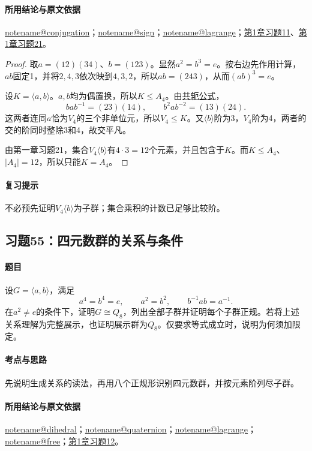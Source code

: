 \documentclass[UTF8,a4paper,11pt,fontset=windows]{ctexart}
\makeatletter
\newcommand{\noteref}[1]{\hyperref[note:#1]{\csname notename@#1\endcsname}}
\newcommand{\proofref}[2]{\hyperref[note:#1]{#2}}
\newcommand{\exref}[2]{\hyperref[ex:#1:#2]{第#1章习题#2}}
\makeatother
\begin{document}
\paragraph{所用结论与原文依据}
\noteref{conjugation}；\noteref{sign}；\noteref{lagrange}；\exref{1}{11}、\exref{1}{21}。


\begin{proof}
取$a=(12)(34)$、$b=(123)$。显然$a^2=b^3=e$。按右边先作用计算，$ab$固定1，并将$2,4,3$依次映到$4,3,2$，所以$ab=(243)$，从而$(ab)^3=e$。

设$K=\langle a,b\rangle$。$a,b$均为偶置换，所以$K\leq A_4$。由\proofref{conjugation}{共轭公式}，
\[
bab^{-1}=(23)(14),\qquad b^2ab^{-2}=(13)(24).
\]
这两者连同$a$恰为$V_4$的三个非单位元，所以$V_4\leq K$。又$\langle b\rangle$阶为3，$V_4$阶为4，两者的交的阶同时整除3和4，故交平凡。

由第一章习题21，集合$V_4\langle b\rangle$有$4\cdot3=12$个元素，并且包含于$K$。而$K\leq A_4$、$|A_4|=12$，所以只能$K=A_4$。
\end{proof}

\paragraph{复习提示}
不必预先证明$V_4\langle b\rangle$为子群；集合乘积的计数已足够比较阶。


\subsection{习题55：\texorpdfstring{四元数群的关系与条件}{四元数群的关系与条件}}
\label{ex:2:55}

\paragraph{题目}
设$G=\langle a,b\rangle$，满足
\[
a^4=b^4=e,\qquad a^2=b^2,\qquad b^{-1}ab=a^{-1}.
\]
在$a^2\ne e$的条件下，证明$G\cong Q_8$，列出全部子群并证明每个子群正规。若将上述关系理解为完整展示，也证明展示群为$Q_8$。仅要求等式成立时，说明为何须加限定。

\paragraph{考点与思路}
先说明生成关系的读法，再用八个正规形识别四元数群，并按元素阶列尽子群。

\paragraph{所用结论与原文依据}
\noteref{dihedral}；\noteref{quaternion}；\noteref{lagrange}；\noteref{free}；\exref{1}{12}。
\end{document}
